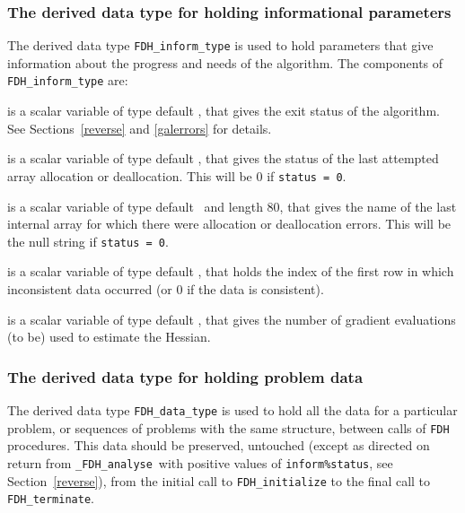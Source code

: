\documentclass{galahad}
\newcommand{\packagename}{FDH}
\newcommand{\fullpackagename}{\libraryname\_\packagename}
\newcommand{\solver}{{\tt \fullpackagename\_analyse}}
\begin{document}

\subsubsection{The derived data type for holding informational
 parameters}\label{typeinform}
The derived data type
{\tt \packagename\_inform\_type}
is used to hold parameters that give information about the progress and needs
of the algorithm. The components of
{\tt \packagename\_inform\_type}
are:

\begin{description}
 is a scalar variable of type default \integer, that gives the
exit status of the algorithm.
See Sections~\ref{reverse} and \ref{galerrors}
for details.

 is a scalar variable of type default \integer, that gives
the status of the last attempted array allocation or deallocation.
This will be 0 if {\tt status = 0}.

 is a scalar variable of type default \character\
and length 80, that  gives the name of the last internal array
for which there were allocation or deallocation errors.
This will be the null string if {\tt status = 0}.

 is a scalar variable of type default \integer, that holds the
index of the first row in which inconsistent data occurred (or 0 if the data is
consistent).

 is a scalar variable of type default \integer, that gives the
number of gradient evaluations (to be) used to estimate the Hessian.

\end{description}


\subsubsection{The derived data type for holding problem data}\label{typedata}
The derived data type
{\tt \packagename\_data\_type}
is used to hold all the data for a particular problem,
or sequences of problems with the same structure, between calls of
{\tt \packagename} procedures.
This data should be preserved, untouched (except as directed on
return from \solver\ with positive values of {\tt inform\%status}, see
Section~\ref{reverse}),
from the initial call to
{\tt \packagename\_initialize}
to the final call to
{\tt \packagename\_terminate}.
\end{document}
